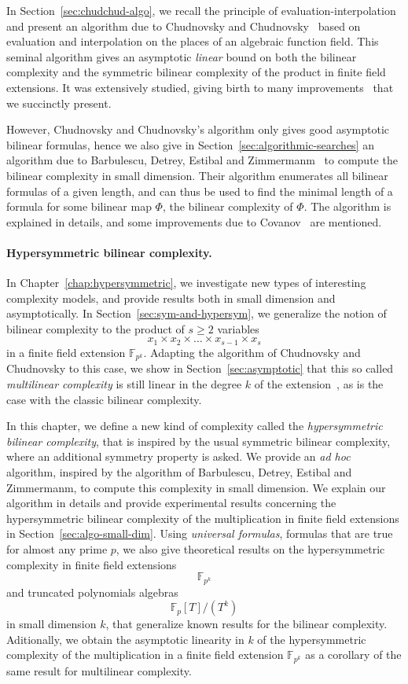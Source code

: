 In Section~\ref{sec:chudchud-algo}, we recall the principle of
evaluation-interpolation and present an algorithm due to Chudnovsky and
Chudnovsky~\cite{CC88} based on evaluation and interpolation on the places of an
algebraic function field. This seminal algorithm gives an asymptotic
\emph{linear} bound on
both the bilinear complexity and the symmetric bilinear complexity of the
product in finite field extensions. It was extensively studied, giving birth to
many improvements~\cite{BR04, CO10, Randriam12} that we succinctly present.

However, Chudnovsky and Chudnovsky's algorithm only gives good asymptotic
bilinear formulas, hence we also
give in Section~\ref{sec:algorithmic-searches} an algorithm due to Barbulescu,
Detrey, Estibal and Zimmermanm~\cite{BDEZ12} to compute the bilinear complexity
in small dimension. Their algorithm enumerates all bilinear formulas of a given
length, and can thus be used to find the minimal length of a formula for some
bilinear map $\Phi$, \ie the bilinear complexity of $\Phi$. The
algorithm is explained in details, and some improvements due to
Covanov~\cite{Covanov19} are mentioned.

\paragraph{Hypersymmetric bilinear complexity.}
In Chapter~\ref{chap:hypersymmetric}, we investigate new types of interesting
complexity models, and provide results both in small dimension and
asymptotically. In Section~\ref{sec:sym-and-hypersym}, we generalize the notion
of bilinear complexity to the product of $s\geq2$ variables
\[
  x_1\times x_2\times\dots\times x_{s-1}\times x_s
\]
in a finite field extension $\mathbb{F}_{p^k}$. Adapting the algorithm of
Chudnovsky and Chudnovsky to this case, we show in Section~\ref{sec:asymptotic}
that this so called \emph{multilinear complexity} is still linear in the degree
$k$ of the extension~\cite{RR21}, as is the case with the classic bilinear
complexity.

In this chapter, we define a new kind of complexity called the
\emph{hypersymmetric bilinear complexity}, that is inspired by the usual
symmetric bilinear complexity, where an additional symmetry property is asked.
We provide an \emph{ad hoc} algorithm, inspired by the algorithm of Barbulescu,
Detrey, Estibal and Zimmermanm, to compute this complexity in small dimension.
We explain our algorithm in details and provide experimental results concerning
the hypersymmetric bilinear complexity of the multiplication in finite field
extensions in Section~\ref{sec:algo-small-dim}. Using \emph{universal formulas},
\ie formulas that are true for almost any prime $p$, we also give theoretical
results on the hypersymmetric complexity in finite field extensions
\[
  \mathbb{F}_{p^{k}}
\]
and truncated polynomials algebras
\[
  \mathbb{F}_p[T]/(T^k)
\]
in small dimension $k$, that generalize known results for the bilinear
complexity. Aditionally, we obtain the asymptotic linearity in $k$ of the
hypersymmetric complexity of the multiplication in a finite field extension
$\mathbb{F}_{p^k}$ as a corollary of the same result for multilinear
complexity.


